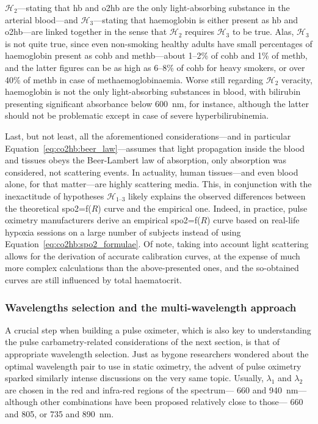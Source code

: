 $\mathcal{H}_2$---stating that \gls{hb} and \gls{o2hb} are the only light-absorbing substance in the arterial blood---and $\mathcal{H}_3$---stating that haemoglobin is either present as \gls{hb} and \gls{o2hb}---are linked together in the sense that $\mathcal{H}_2$ requires $\mathcal{H}_3$ to be true. Alas, $\mathcal{H}_3$ is not quite true, since even non-smoking healthy adults have small percentages of haemoglobin present as \gls{cohb} and \gls{methb}---about 1--2\% of \gls{cohb} and 1\% of \gls{methb}, and the latter figures can be as high as 6--8\% of \gls{cohb} for heavy smokers, or over 40\% of \gls{methb} in case of methaemoglobinaemia\cite{nordenberg1990, ashbernal2004, remigio2022}. Worse still regarding $\mathcal{H}_2$ veracity, haemoglobin is not the only light-absorbing substances in blood, with bilirubin presenting significant absorbance below 600~nm, for instance, although the latter should not be problematic except in case of severe hyperbilirubinemia\cite{beall1989, veyckemans1990, meinke2007}.

Last, but not least, all the aforementioned considerations---and in particular Equation~\ref{eq:co2hb:beer_law}---assumes that light propagation inside the blood and tissues obeys the Beer-Lambert law of absorption, \ie{} only absorption was considered, not scattering events. In actuality, human tissues---and even blood alone, for that matter---are highly scattering media\cite{jacques2013, bosschaart2014}. This, in conjunction with the inexactitude of hypotheses $\mathcal{H}_\text{1--3}$ likely explains the observed differences between the theoretical \gls{spo2}=f($R$) curve and the empirical one. Indeed, in practice, pulse oximetry manufacturers derive an empirical \gls{spo2}=f($R$) curve based on real-life hypoxia sessions on a large number of subjects instead of using Equation~\ref{eq:co2hb:spo2_formulae}\cite[Chap.~10]{webster1997design}. Of note, taking into account light scattering allows for the derivation of accurate calibration curves, at the expense of much more complex calculations than the above-presented ones\cite{schmitt1991}, and the so-obtained curves are still influenced by total haematocrit\cite{mannheimer1997}.

\subsubsection{Wavelengths selection and the multi-wavelength approach}\label{sect:co2hb:spo2_multiwl}

A crucial step when building a pulse oximeter, which is also key to understanding the pulse carbametry-related considerations of the next section, is that of appropriate wavelength selection. Just as bygone researchers wondered about the optimal wavelength pair to use in static oximetry\cite{nilsson1960, mook1969}, the advent of pulse oximetry sparked similarly intense discussions on the very same topic\cite[Chap.~4]{damianou1995, mannheimer1997, vazquezjaccaud2011}. Usually, $\lambda_1$ and $\lambda_2$ are chosen in the red and infra-red regions of the spectrum---\eg{} 660 and 940~nm---although other combinations have been proposed relatively close to those---\eg{} 660 and 805, or 735 and 890~nm\cite{mannheimer1997, li2014}.

